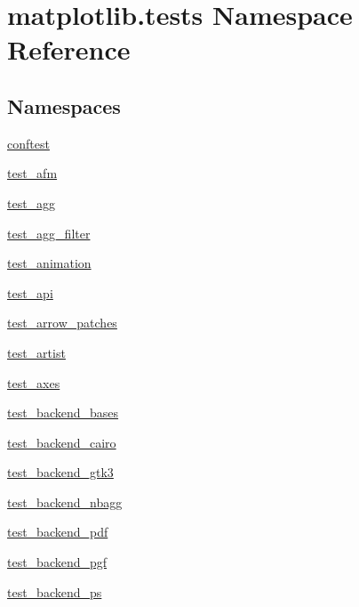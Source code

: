 \hypertarget{namespacematplotlib_1_1tests}{}\section{matplotlib.\+tests Namespace Reference}
\label{namespacematplotlib_1_1tests}
\subsection*{Namespaces}
\begin{DoxyCompactItemize}
\item 
 \hyperlink{namespacematplotlib_1_1tests_1_1conftest}{conftest}
\item 
 \hyperlink{namespacematplotlib_1_1tests_1_1test__afm}{test\+\_\+afm}
\item 
 \hyperlink{namespacematplotlib_1_1tests_1_1test__agg}{test\+\_\+agg}
\item 
 \hyperlink{namespacematplotlib_1_1tests_1_1test__agg__filter}{test\+\_\+agg\+\_\+filter}
\item 
 \hyperlink{namespacematplotlib_1_1tests_1_1test__animation}{test\+\_\+animation}
\item 
 \hyperlink{namespacematplotlib_1_1tests_1_1test__api}{test\+\_\+api}
\item 
 \hyperlink{namespacematplotlib_1_1tests_1_1test__arrow__patches}{test\+\_\+arrow\+\_\+patches}
\item 
 \hyperlink{namespacematplotlib_1_1tests_1_1test__artist}{test\+\_\+artist}
\item 
 \hyperlink{namespacematplotlib_1_1tests_1_1test__axes}{test\+\_\+axes}
\item 
 \hyperlink{namespacematplotlib_1_1tests_1_1test__backend__bases}{test\+\_\+backend\+\_\+bases}
\item 
 \hyperlink{namespacematplotlib_1_1tests_1_1test__backend__cairo}{test\+\_\+backend\+\_\+cairo}
\item 
 \hyperlink{namespacematplotlib_1_1tests_1_1test__backend__gtk3}{test\+\_\+backend\+\_\+gtk3}
\item 
 \hyperlink{namespacematplotlib_1_1tests_1_1test__backend__nbagg}{test\+\_\+backend\+\_\+nbagg}
\item 
 \hyperlink{namespacematplotlib_1_1tests_1_1test__backend__pdf}{test\+\_\+backend\+\_\+pdf}
\item 
 \hyperlink{namespacematplotlib_1_1tests_1_1test__backend__pgf}{test\+\_\+backend\+\_\+pgf}
\item 
 \hyperlink{namespacematplotlib_1_1tests_1_1test__backend__ps}{test\+\_\+backend\+\_\+ps}

\end{DoxyCompactItemize}
